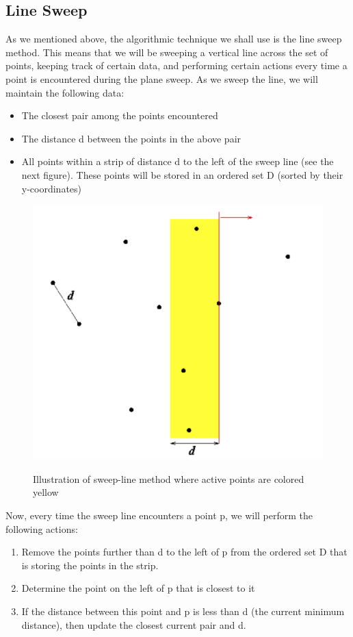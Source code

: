 \documentclass[12pt]{article}
\begin{document}
\subsection{Line Sweep}
As we mentioned above, the algorithmic technique we shall use is the 
line sweep method. This means that we will be sweeping a vertical line 
across the set of points, keeping track of certain data, and performing 
certain actions every time a point is encountered during the plane sweep.
As we sweep the line, we will maintain the following data:
\begin{itemize}
  \item The closest pair among the points encountered
  \item The distance d between the points in the above pair
  \item All points within a strip of distance d to the left of the sweep 
  line (see the next figure). These points will be stored in an ordered set D 
  (sorted by their y-coordinates)
\end{itemize}

\begin{center}
  \begin{figure}[!htb]
    \centering
    \includegraphics[width=.5\linewidth]{figures/fig22.png}
    \label{fig:23}
    \caption{Illustration of sweep-line method where active points are colored yellow}
  \end{figure}
\end{center}

Now, every time the sweep line encounters a point p, we will perform the 
following actions:
\begin{enumerate}
  \item Remove the points further than d to the left of p from the ordered set D that is storing the points in the strip.
  \item Determine the point on the left of p that is closest to it
  \item If the distance between this point and p is less than d (the current minimum distance), then update the closest current pair and d.
\end{enumerate}
\end{document}
